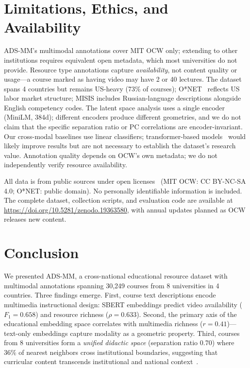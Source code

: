 \documentclass[sigconf,review]{acmart}
\newcommand{\NumUniversities}{8}
\newcommand{\NumCountries}{4}
\newcommand{\NumCourses}{30,249}
\newcommand{\SBERTRichnessRho}{0.633}
\newcommand{\SBERTVideoF}{0.658}
\newcommand{\ADSMM}{\textsc{ADS-MM}\xspace}
\begin{document}
\section{Limitations, Ethics, and Availability}
\label{sec:limitations}

\ADSMM's multimodal annotations cover MIT OCW only; extending to other institutions requires equivalent open metadata, which most universities do not provide.
Resource type annotations capture \emph{availability}, not content quality or usage---a course marked as having video may have 2 or 40 lectures.
The dataset spans {\NumCountries} countries but remains US-heavy (73\% of courses); O*NET~\cite{onet2025} reflects US labor market structure; MISIS includes Russian-language descriptions alongside English competency codes.
The latent space analysis uses a single encoder (MiniLM, 384d); different encoders produce different geometries, and we do not claim that the specific separation ratio or PC correlations are encoder-invariant.
Our cross-modal baselines use linear classifiers; transformer-based models~\cite{devlin2019bert} would likely improve results but are not necessary to establish the dataset's research value.
Annotation quality depends on OCW's own metadata; we do not independently verify resource availability.

All data is from public sources under open licenses~\cite{gebru2021datasheets} (MIT OCW: CC BY-NC-SA 4.0; O*NET: public domain).
No personally identifiable information is included.
The complete dataset, collection scripts, and evaluation code are available at \url{https://doi.org/10.5281/zenodo.19363580}, with annual updates planned as OCW releases new content.


\section{Conclusion}

We presented \ADSMM, a cross-national educational resource dataset with multimodal annotations spanning {\NumCourses} courses from {\NumUniversities} universities in {\NumCountries} countries.
Three findings emerge.
First, course text descriptions encode multimedia instructional design: SBERT embeddings predict video availability ($F_1{=}{\SBERTVideoF}$) and resource richness ($\rho{=}{\SBERTRichnessRho}$).
Second, the primary axis of the educational embedding space correlates with multimedia richness ($r{=}0.41$)---text-only embeddings capture modality as a geometric property.
Third, courses from 8 universities form a \emph{unified didactic space} (separation ratio 0.70) where 36\% of nearest neighbors cross institutional boundaries, suggesting that curricular content transcends institutional and national context~\cite{marginson2022global,oecd2023education}.
\end{document}
